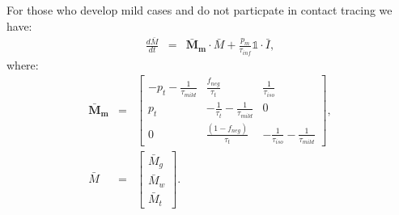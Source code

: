 \documentclass[notitlepage, superscriptaddress]{revtex4-2}
\begin{document}
For those who develop mild cases and do not particpate in contact tracing we have:
\begin{eqnarray}
\frac{d\bar{M}}{dt} &=& \boldsymbol{\bar{M}_{m}} \cdot \bar{M} + \frac{p_{m}}{\tau_{inf}} \mathbb{1} \cdot  \bar{I}, 
\end{eqnarray}
where:
%
\begin{eqnarray}
\boldsymbol{\bar{M}_{m}} &=&
\begin{bmatrix}
- p_{t} -\frac{1}{\tau_{mild}}  &  \frac{f_{neg}}{\tau_{t}}            & \frac{1}{\tau_{iso}} \\ 
 p_{t}              & -\frac{1}{\tau_{t}} -\frac{1}{\tau_{mild}}       & 0  \\ 
 0                  & \frac{(1- f_{neg})}{\tau_{t}}                        & -\frac{1}{\tau_{iso}} -\frac{1}{\tau_{mild}}
\end{bmatrix}, \\ 
%
\bar{M} &=& 
\begin{bmatrix}
\bar{M}_{g} \\ \bar{M}_{w}\\ \bar{M}_{t}
\end{bmatrix}. \\ 
%
%
\end{eqnarray} 
\end{document}

